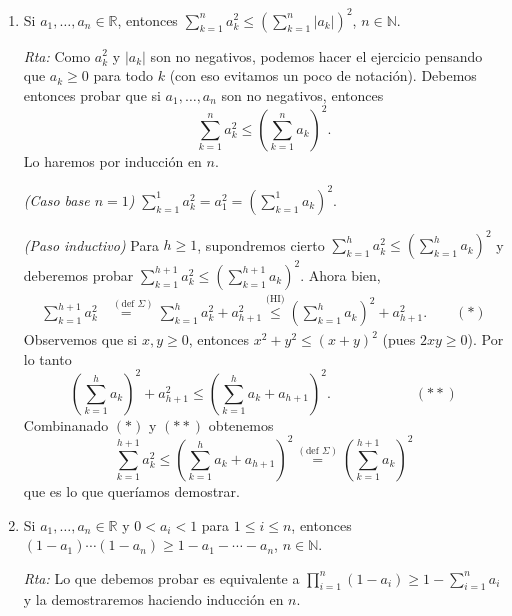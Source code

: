 \documentclass[12pt,spanish,makeidx]{amsbook}
\newcommand{\rta}{\noindent\textit{Rta: }}
\begin{document}
\begin{enumerate}
\begin{enumerate}
			
			\item Si $a_1,\dots,a_n \in \mathbb R$, entonces $\displaystyle{\sum_{k=1}^n a_{k}^{2}\leq \left(\sum_{k=1}^n |a_{k}|\right)^{2}}$, $n\in \mathbb N$.
			
			\rta Como $a_k^2$ y $|a_k|$ son no negativos, podemos hacer el ejercicio pensando que $a_k \ge 0$ para todo $k$ (con eso evitamos un poco de notación). Debemos entonces probar que  si $a_1,\dots,a_n $ son no negativos, entonces
			\begin{equation*}
				\sum_{k=1}^n a_{k}^{2}\leq \left(\sum_{k=1}^n a_{k}\right)^{2}. 
			\end{equation*} 
			Lo haremos por inducción en $n$.
			 
			\textit{(Caso base $n=1$) } $\sum_{k=1}^1 a_{k}^{2} = a_1^2 = (\sum_{k=1}^1 a_{k})^{2}$.
			
			\textit{(Paso inductivo) }  Para  $h \ge 1$,  supondremos cierto $\sum_{k=1}^h a_{k}^{2}\leq \left(\sum_{k=1}^h a_{k}\right)^{2}$ y deberemos  probar $\sum_{k=1}^{h+1} a_{k}^{2}\leq \left(\sum_{k=1}^{h+1} a_{k}\right)^{2}$.  Ahora bien,
			\begin{align*}
			\sum_{k=1}^{h+1} a_{k}^{2} &\overset{(\text{def } \Sigma)}{=\quad} \sum_{k=1}^h a_{k}^{2} + a_{h+1}^{2} \overset{\text{(HI)}}{\leq} \left(\sum_{k=1}^h a_{k}\right)^{2} + a_{h+1}^{2}. \qquad (*)
			\end{align*}
			Observemos que si $x,y \ge 0$,  entonces $x^2 + y^2 \leq (x+y)^2$ (pues $2xy \ge 0$). Por lo tanto 
			\begin{equation*}
				 \left(\sum_{k=1}^h a_{k}\right)^{2} + a_{h+1}^{2} \leq  \left(\sum_{k=1}^h a_{k}+a_{h+1}\right)^{2}. \qquad\qquad\qquad (**)
			\end{equation*}
			Combinanado $(*)$ y $(**)$ obtenemos
			\begin{equation*}
				\sum_{k=1}^{h+1} a_{k}^{2} \leq \left(\sum_{k=1}^h a_{k}+a_{h+1}\right)^{2} \overset{(\text{def } \Sigma)}{=} \left(\sum_{k=1}^{h+1} a_{k}\right)^{2}
			\end{equation*}
			que es lo que queríamos demostrar. 
			
			\item Si $a_1,\dots,a_n \in \mathbb R$ y $0<a_i<1$ para $1 \le i\le n$, entonces $(1-a_1)\cdots(1-a_n)\ge 1-a_1-\cdots -a_n$, $n\in \mathbb N$.
			
			\rta Lo que debemos probar es equivalente a $\prod_{i=1}^{n} (1-a_i) \ge 1 - \sum_{i=1}^{n} a_i$ y la demostraremos haciendo inducción en $n$.  
			

\end{enumerate}
\end{enumerate}
\end{document}
